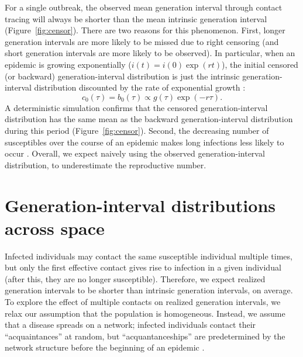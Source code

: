 \documentclass[12pt]{article}
\newcommand{\rev}[1]{}
\begin{document}
For a single outbreak, the observed mean  generation interval through contact tracing will always be shorter than the mean intrinsic generation interval (Figure~\ref{fig:censor}).
There are two reasons for this phenomenon.
First, longer generation intervals are more likely to be missed due to right censoring (and short generation intervals are more likely to be observed).
In particular, when an epidemic is growing exponentially ($i(t) = i(0) \exp(rt)$), 
the initial censored (or backward) generation-interval distribution is just the intrinsic generation-interval distribution discounted by the rate of exponential growth \citep{britton2019estimation}:
\begin{equation}
c_0(\tau) = b_0(\tau) \propto g(\tau) \exp(-r\tau).
\label{eq:exp}
\end{equation}
A deterministic simulation confirms that the censored generation-interval distribution has the same mean as the backward generation-interval distribution during this period (Figure~\ref{fig:censor}).
Second, the decreasing number of susceptibles over the course of an epidemic makes long infections less likely to occur \citep{champredon2015intrinsic}.
Overall, we expect naively using the observed generation-interval distribution, to underestimate the reproductive number.


\section{Generation-interval distributions across space}

\rev{
I have a problem with $N(a)$. Does your model allow for different number of acquaintances? But then your $R_0$ is no longer valid. Also, you are always assuming neighbours/acquaintances are chosen at random - please stress this more.
}
Infected individuals may contact the same susceptible individual multiple times, but only the first effective contact gives rise to infection in a given individual (after this, they are no longer susceptible).
Therefore, we expect realized generation intervals to be shorter than intrinsic generation intervals, on average.
To explore the effect of multiple contacts on realized generation intervals, we relax our assumption that the population is homogeneous.
Instead, we assume that a disease spreads on a network;
infected individuals contact their ``acquaintances'' at random, but ``acquantanceships'' are predetermined by the network structure before the beginning of an epidemic \cite{trapman2016inferring}.
\end{document}
